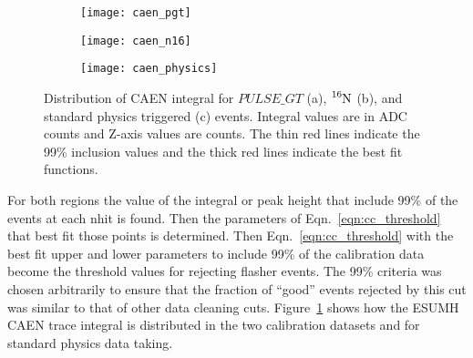\begin{figure}[htbp]
    \centering
    \begin{subfigure}[b]{0.48\textwidth}
        \centering
        \texttt{[image: caen\_pgt]}
        \caption[]{}
    \end{subfigure}
    \hfill
    \begin{subfigure}[b]{0.48\textwidth}
        \centering
        \texttt{[image: caen\_n16]}
        \caption[]{}
    \end{subfigure}

    \begin{subfigure}[b]{0.50\textwidth}
        \centering
        \texttt{[image: caen\_physics]}
        \caption[]{}
    \end{subfigure}
    \caption[]{Distribution of CAEN integral for $PULSE\_GT$ (a), $\ce{^{16}N}$ (b), and
    standard physics triggered (c) events. Integral values are in ADC counts
    and Z-axis values are counts. The thin red lines indicate the 99\% inclusion
    values and the thick red lines indicate the best fit functions.}
    \label{fig:caen_inclusion}
\end{figure}

For both regions the value of the integral or peak height that include
99\% of the events at each nhit is found. Then the parameters of
Eqn.~\ref{eqn:cc_threshold} that best fit those points is determined.
Then Eqn.~\ref{eqn:cc_threshold} with the best fit upper and lower
parameters to include 99\% of the calibration data become the threshold
values for rejecting flasher events.
The 99\% criteria was chosen arbitrarily to ensure that the fraction of
``good'' events rejected by this cut was similar to that of other data
cleaning cuts.
Figure~\ref{fig:caen_inclusion} shows how the ESUMH CAEN trace integral is distributed
in the two calibration datasets and for standard physics data taking.



